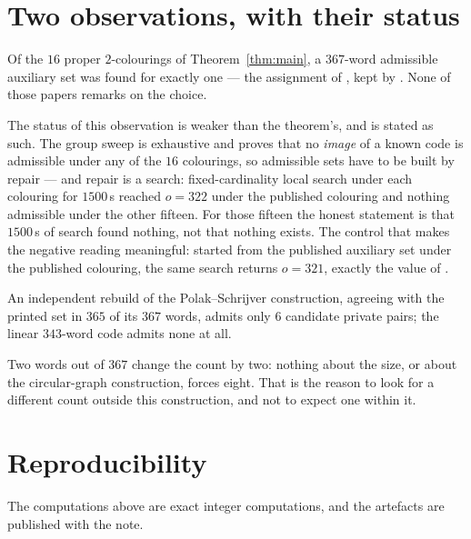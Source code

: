 \section{Two observations, with their status}
\label{sec:obs}

\begin{observation}
\label{obs:colour}
Of the $16$ proper $2$-colourings of Theorem~\ref{thm:main}, a $367$-word admissible
auxiliary set was found for exactly one --- the assignment of \cite{itty2026}, kept by
\cite{gao2026,bpz2026,tandon2026}. None of those papers remarks on the choice.
\end{observation}

The status of this observation is weaker than the theorem's, and is stated as such. The group
sweep is exhaustive and proves that no \emph{image} of a known code is admissible under any of the
$16$ colourings, so admissible sets have to be built by repair --- and repair is a search:
fixed-cardinality local search under each colouring for $1500$\,s reached $o=322$ under the
published colouring and nothing admissible under the other fifteen. For those fifteen the honest
statement is that $1500$\,s of search found nothing, not that nothing exists. The control that
makes the negative reading meaningful: started from the published auxiliary set under the
published colouring, the same search returns $o=321$, exactly the value of \cite{gao2026}.

\begin{observation}
\label{obs:fragile}
An independent rebuild of the Polak--Schrijver construction, agreeing with the printed set in
$365$ of its $367$ words, admits only $6$ candidate private pairs; the linear $343$-word code
admits none at all.
\end{observation}

Two words out of $367$ change the count by two: nothing about the size, or about the
circular-graph construction, forces eight. That is the reason to look for a different count
outside this construction, and not to expect one within it.

\section{Reproducibility}
\label{sec:repro}

The computations above are exact integer computations, and the artefacts are published with
the note.

